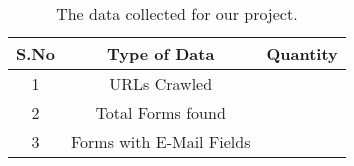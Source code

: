 \begin{table}[!htbp]
	\centering
	\begin{tabular}{|c|c|c|}
		\hline
		\multicolumn{1}{|c|}{\textbf{S.No}} &
		\multicolumn{1}{c|}{\textbf{Type of Data}} &
		\multicolumn{1}{c|}{\textbf{Quantity}}\\
		\hline
		1 & URLs Crawled & \urls \\
		\hline
		2 & Total Forms found & \forms \\
		\hline
		3 & Forms with E-Mail Fields & \emailforms \\
		\hline
	\end{tabular}
	\caption[Collected data]{The data collected for our project.}
	\label{tab:data}
\end{table}